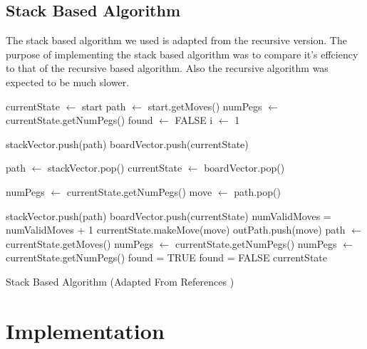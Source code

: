 \documentclass[a4paper]{article}
\begin{document}
\subsection{Stack Based Algorithm}
The stack based algorithm we used is adapted from the recursive version. The purpose of implementing the stack based algorithm was to compare it's effciency to that of the recursive based algorithm. Also the recursive algorithm was expected to be much slower.

\begin{algorithm}[H]
	\begin{algorithmic}[1]
			\State currentState $\leftarrow$ start
			\State path $\leftarrow$ start.getMoves()
			\State numPegs $\leftarrow$ currentState.getNumPegs()
			\State found $\leftarrow$ FALSE
			\State i $\leftarrow$ 1

			\State stackVector.push(path)
			\State boardVector.push(currentState)

				\State path $\leftarrow$ stackVector.pop()
				\State currentState $\leftarrow$ boardVector.pop()

					\State numPegs $\leftarrow$ currentState.getNumPegs()
					\State move $\leftarrow$ path.pop()

						\State stackVector.push(path)
						\State boardVector.push(currentState)
						\State numValidMoves = numValidMoves + 1
						\State currentState.makeMove(move)
						\State outPath.push(move)
						\State path $\leftarrow$ currentState.getMoves()
						\State numPegs $\leftarrow$ currentState.getNumPegs()
					\EndIf
				\EndWhile
				\State numPegs $\leftarrow$ currentState.getNumPegs()
					\State found = TRUE
				\Else
					\State found = FALSE
				\EndIf
			\EndWhile
			\Return currentState
		\EndProcedure
	\end{algorithmic}
	\caption{Stack Based Algorithm (Adapted From References \cite{lab5})}\label{euclid}
\end{algorithm}

\section{Implementation}
\end{document}
